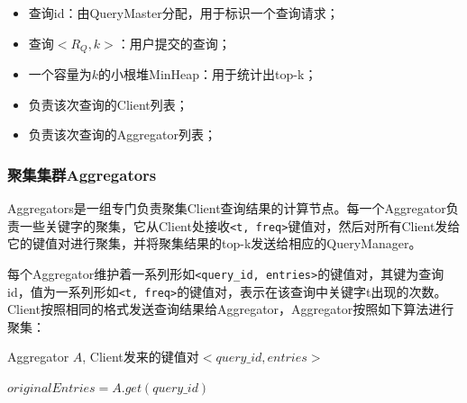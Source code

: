 \documentclass{elegantpaper}
\begin{document}
\begin{itemize}

    \item 查询id：由QueryMaster分配，用于标识一个查询请求；
    
    \item 查询$<R_Q, k>$：用户提交的查询；
    
    \item 一个容量为$k$的小根堆MinHeap：用于统计出top-k；
    
    \item 负责该次查询的Client列表；
    
    \item 负责该次查询的Aggregator列表；
    
\end{itemize}

\subsubsection{聚集集群Aggregators}

Aggregators是一组专门负责聚集Client查询结果的计算节点。每一个Aggregator负责一些关键字的聚集，它从Client处接收\verb|<t, freq>|键值对，然后对所有Client发给它的键值对进行聚集，并将聚集结果的top-k发送给相应的QueryManager。

\noindent 每个Aggregator维护着一系列形如\verb|<query_id, entries>|的键值对，其键为查询id，值为一系列形如\verb|<t, freq>|的键值对，表示在该查询中关键字t出现的次数。Client按照相同的格式发送查询结果给Aggregator，Aggregator按照如下算法进行聚集：

\begin{algorithm}

    \begin{algorithmic}[1]

        \Require Aggregator $A$, Client发来的键值对$<query\_id, entries>$

                \State $originalEntries = A.get(query\_id)$
                    \Else
                    \EndIf
                \EndFor
            \Else
            \EndIf
        \EndFunction
        
    \end{algorithmic}
    
\end{algorithm}
\end{document}
